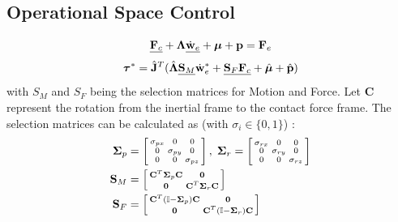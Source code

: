 \documentclass[a4paper, 8pt]{extarticle}
\begin{document}
\begin{multicols*}{3}
\subsection*{Operational Space Control}
$$
\underline{{\bf F}_c} + \bm\Lambda \underline{\dot{\bf w}_e} + \bm\mu + {\bf p} = {\bf F}_e $$
$$
\bm\tau^* = \hat{\bf J}^T(\hat{\bm\Lambda} \underline{{\bf S}_M} \dot{\bf w}_e^* + \underline{{\bf S}_F{\bf F}_c} + \hat{\bm\mu} + \hat{\bf p})
$$\newline
with $S_{M}$ and $S_{F}$ being the selection matrices for Motion and Force. Let {\bf C} represent the rotation from the inertial frame to the contact force frame. The selection matrices can be calculated as (with $\sigma_{i} \in \{0,1\}$) :
\begin{align*}
\bm\Sigma_p &= \left[\begin{smallmatrix}
\sigma_{px} & 0 & 0 \\
0 & \sigma_{py} & 0 \\
0 & 0 & \sigma_{pz} \end{smallmatrix}\right], \;
\bm\Sigma_r = \left[\begin{smallmatrix}
\sigma_{rx} & 0 & 0 \\
0 & \sigma_{ry} & 0 \\
0 & 0 & \sigma_{rz} \end{smallmatrix}\right] \\
{\bf S}_M &= \left[\begin{smallmatrix}
{\bf C}^T\bm\Sigma_p{\bf C} & {\bf 0} \\
{\bf 0}  &  {\bf C}^T\bm\Sigma_r{\bf C}
\end{smallmatrix}\right]\\
{\bf S}_F &= \left[\begin{smallmatrix}
{\bf C}^T(\mathbb I - \bm\Sigma_p) {\bf C} & {\bf 0} \\
{\bf 0}  &  {\bf C}^T(\mathbb I - \bm\Sigma_r) {\bf C}
\end{smallmatrix}\right]
\end{align*}


\end{multicols*}
\end{document}
